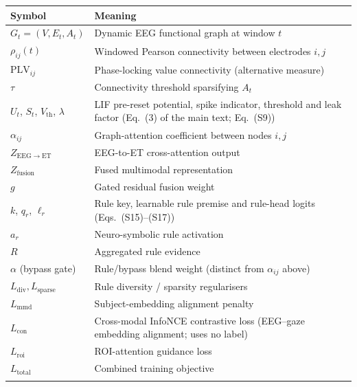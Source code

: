 \documentclass[pdflatex,sn-basic,Numbered]{sn-jnl}
\makeatletter
\newenvironment{suptable}{\par\bigskip\noindent\begin{minipage}{\textwidth}\def\@captype{table}\centering\tablebodyfont}{\end{minipage}\par\bigskip}
\makeatother
\begin{document}
\begin{suptable}
\caption{Mathematical notation of the Methods (Section~2.4 and Note~S1), in order of first use.}\label{tabS4}
\small
\begin{tabular*}{\linewidth}{@{\extracolsep{\fill}}lp{9cm}@{}}
\toprule
Symbol & Meaning \\
\midrule
$G_t=(V,E_t,A_t)$ & Dynamic EEG functional graph at window $t$ \\
$\rho_{ij}(t)$ & Windowed Pearson connectivity between electrodes $i,j$ \\
$\mathrm{PLV}_{ij}$ & Phase-locking value connectivity (alternative measure) \\
$\tau$ & Connectivity threshold sparsifying $A_t$ \\
$U_t$, $S_t$, $V_{\mathrm{th}}$, $\lambda$ & LIF pre-reset potential, spike indicator, threshold and leak factor (Eq.~(3) of the main text; Eq.~(S9)) \\
$\alpha_{ij}$ & Graph-attention coefficient between nodes $i,j$ \\
$Z_{\mathrm{EEG}\to\mathrm{ET}}$ & EEG-to-ET cross-attention output \\
$Z_{\mathrm{fusion}}$ & Fused multimodal representation \\
$g$ & Gated residual fusion weight \\
$k$, $q_r$, $\ell_r$ & Rule key, learnable rule premise and rule-head logits (Eqs.~(S15)--(S17)) \\
$a_r$ & Neuro-symbolic rule activation \\
$R$ & Aggregated rule evidence \\
$\alpha$ (bypass gate) & Rule/bypass blend weight (distinct from $\alpha_{ij}$ above) \\
$L_{\mathrm{div}}, L_{\mathrm{sparse}}$ & Rule diversity / sparsity regularisers \\
$L_{\mathrm{mmd}}$ & Subject-embedding alignment penalty \\
$L_{\mathrm{con}}$ & Cross-modal InfoNCE contrastive loss (EEG--gaze embedding alignment; uses no label) \\
$L_{\mathrm{roi}}$ & ROI-attention guidance loss \\
$L_{\mathrm{total}}$ & Combined training objective \\
\botrule
\end{tabular*}
\end{suptable}
\end{document}
